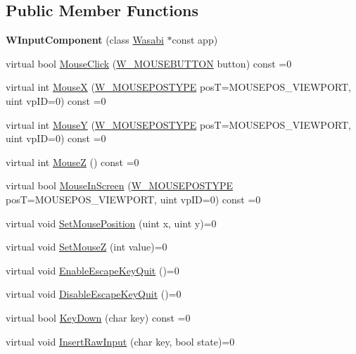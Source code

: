 \subsection*{Public Member Functions}
\begin{DoxyCompactItemize}
\item 
{\bfseries W\+Input\+Component} (class \hyperlink{class_wasabi}{Wasabi} $\ast$const app)\hypertarget{class_w_input_component_a20680905a4a9350b143e4bbf4b390a4f}{}\label{class_w_input_component_a20680905a4a9350b143e4bbf4b390a4f}

\item 
virtual bool \hyperlink{class_w_input_component_a9416ef58792ed581cf20495e40f3cd7e}{Mouse\+Click} (\hyperlink{group__engineclass_ga9e78ddd4770694b21c0d4b852e9c800e}{W\+\_\+\+M\+O\+U\+S\+E\+B\+U\+T\+T\+ON} button) const  =0
\item 
virtual int \hyperlink{class_w_input_component_af9eb7dbdbb354a41fa1c26d926e0cffd}{MouseX} (\hyperlink{group__engineclass_ga6b8628ac07d789a9caf635eb23728d04}{W\+\_\+\+M\+O\+U\+S\+E\+P\+O\+S\+T\+Y\+PE} posT=M\+O\+U\+S\+E\+P\+O\+S\+\_\+\+V\+I\+E\+W\+P\+O\+RT, uint vp\+ID=0) const  =0
\item 
virtual int \hyperlink{class_w_input_component_a4f3efd39201a9a1d4ac7c9916d3ff3b3}{MouseY} (\hyperlink{group__engineclass_ga6b8628ac07d789a9caf635eb23728d04}{W\+\_\+\+M\+O\+U\+S\+E\+P\+O\+S\+T\+Y\+PE} posT=M\+O\+U\+S\+E\+P\+O\+S\+\_\+\+V\+I\+E\+W\+P\+O\+RT, uint vp\+ID=0) const  =0
\item 
virtual int \hyperlink{class_w_input_component_ad11411a1d83250928b1ab2fcd2352e94}{MouseZ} () const  =0
\item 
virtual bool \hyperlink{class_w_input_component_a710bbc2a7c0e94004f9e2501ad7b89f4}{Mouse\+In\+Screen} (\hyperlink{group__engineclass_ga6b8628ac07d789a9caf635eb23728d04}{W\+\_\+\+M\+O\+U\+S\+E\+P\+O\+S\+T\+Y\+PE} posT=M\+O\+U\+S\+E\+P\+O\+S\+\_\+\+V\+I\+E\+W\+P\+O\+RT, uint vp\+ID=0) const  =0
\item 
virtual void \hyperlink{class_w_input_component_a597f62ecc1d412affa3a85d7119d005a}{Set\+Mouse\+Position} (uint x, uint y)=0
\item 
virtual void \hyperlink{class_w_input_component_a5dbfe1f01864bb850567fb668cb937c7}{Set\+MouseZ} (int value)=0
\item 
virtual void \hyperlink{class_w_input_component_a98e65d9907cc3d48149914e89ba43c9f}{Enable\+Escape\+Key\+Quit} ()=0
\item 
virtual void \hyperlink{class_w_input_component_afade96a44f4c80f8133f960d0d917d71}{Disable\+Escape\+Key\+Quit} ()=0
\item 
virtual bool \hyperlink{class_w_input_component_a127b8208fbb4651d5907619316adf029}{Key\+Down} (char key) const  =0
\item 
virtual void \hyperlink{class_w_input_component_aea828172bca4778333cb61c6261b8c4b}{Insert\+Raw\+Input} (char key, bool state)=0
\end{DoxyCompactItemize}
